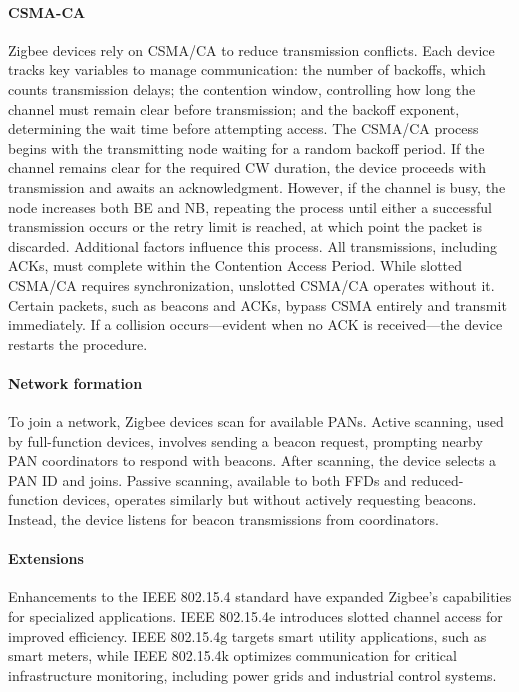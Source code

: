 \paragraph*{CSMA-CA}
Zigbee devices rely on CSMA/CA to reduce transmission conflicts. 
Each device tracks key variables to manage communication: the number of backoffs, which counts transmission delays; the contention window, controlling how long the channel must remain clear before transmission; and the backoff exponent, determining the wait time before attempting access.
The CSMA/CA process begins with the transmitting node waiting for a random backoff period. 
If the channel remains clear for the required CW duration, the device proceeds with transmission and awaits an acknowledgment. 
However, if the channel is busy, the node increases both BE and NB, repeating the process until either a successful transmission occurs or the retry limit is reached, at which point the packet is discarded.
Additional factors influence this process. 
All transmissions, including ACKs, must complete within the Contention Access Period. 
While slotted CSMA/CA requires synchronization, unslotted CSMA/CA operates without it. 
Certain packets, such as beacons and ACKs, bypass CSMA entirely and transmit immediately. 
If a collision occurs—evident when no ACK is received—the device restarts the procedure.

\paragraph*{Network formation}
To join a network, Zigbee devices scan for available PANs. 
Active scanning, used by full-function devices, involves sending a beacon request, prompting nearby PAN coordinators to respond with beacons. 
After scanning, the device selects a PAN ID and joins. 
Passive scanning, available to both FFDs and reduced-function devices, operates similarly but without actively requesting beacons.
Instead, the device listens for beacon transmissions from coordinators.

\paragraph*{Extensions}
Enhancements to the IEEE 802.15.4 standard have expanded Zigbee's capabilities for specialized applications.
IEEE 802.15.4e introduces slotted channel access for improved efficiency. 
IEEE 802.15.4g targets smart utility applications, such as smart meters, while IEEE 802.15.4k optimizes communication for critical infrastructure monitoring, including power grids and industrial control systems.